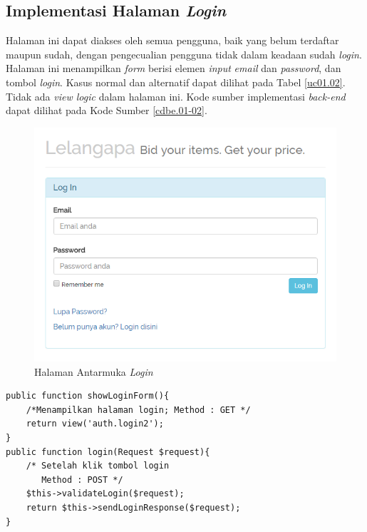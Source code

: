 \subsection{Implementasi Halaman \textit{Login}}
Halaman ini dapat diakses oleh semua pengguna, baik yang belum terdaftar maupun sudah, dengan pengecualian pengguna tidak dalam keadaan sudah \textit{login}. Halaman ini menampilkan \textit{form} berisi elemen \textit{input} \textit{email} dan \textit{password}, dan tombol \textit{login}. Kasus normal dan alternatif dapat dilihat pada Tabel \ref{uc01.02}. Tidak ada \textit{view logic} dalam halaman ini. Kode sumber implementasi \textit{back-end} dapat dilihat pada Kode Sumber \ref{cdbe.01-02}.

\begin{figure}[H]
	\centering
	\includegraphics[width=.8\textwidth]{images/bab4/ui/01-02.png}
	\caption{Halaman Antarmuka \textit{Login}}
	\label{ui.01-02}
\end{figure}

\begin{lstlisting}[label=cdbe.01-02,style=php,caption=Implementasi Antarmuka \textit{Login}]
public function showLoginForm(){
	/*Menampilkan halaman login; Method : GET */
	return view('auth.login2');
}
public function login(Request $request){
	/* Setelah klik tombol login
	   Method : POST */
	$this->validateLogin($request);
	return $this->sendLoginResponse($request);
}
\end{lstlisting}


